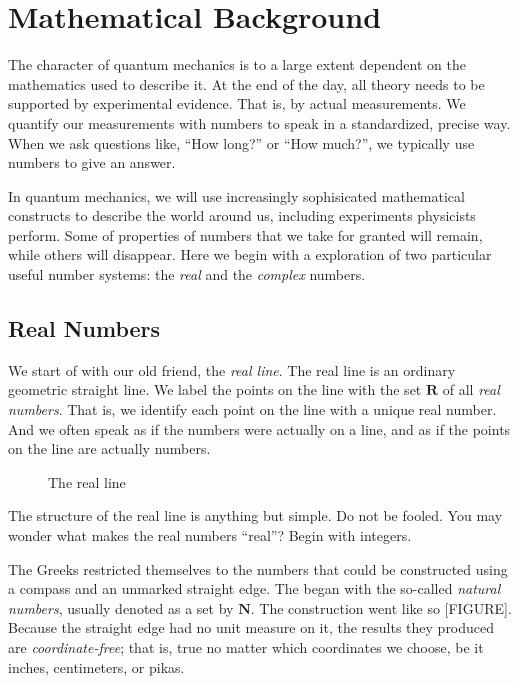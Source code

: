 \setchapterpreamble[u]{\margintoc}
\chapter{Mathematical Background}

The character of quantum mechanics is to a large extent dependent on the mathematics used to describe it. At the end of the day, all theory needs to be supported by experimental evidence. That is, by actual measurements. We quantify our measurements with numbers to speak in a standardized, precise way. When we ask questions like, ``How long?'' or ``How much?'', we typically use numbers to give an answer.

In quantum mechanics, we will use increasingly sophisicated mathematical constructs to describe the world around us, including experiments physicists perform. Some of properties of numbers that we take for granted will remain, while others will disappear. Here we begin with a exploration of two particular useful number systems: the \emph{real} and the \emph{complex} numbers.

\section{Real Numbers}

We start of with our old friend, the \emph{real line}. The real line is an ordinary geometric straight line. We label the points on the line with the set $\mathbf{R}$ of all \emph{real numbers}. That is, we identify each point on the line with a unique real number. And  we often speak as if the numbers were actually on a line, and as if the points on the line are actually numbers.

\begin{figure}[h]

\caption{The real line}
\end{figure}

The structure of the real line is anything but simple. Do not be fooled. You may wonder what makes the real numbers ``real''? Begin with integers.

The Greeks restricted themselves to the numbers that could be constructed using a compass and an unmarked straight edge. The began with the so-called \emph{natural numbers}, usually denoted as a set by $\mathbf{N}$. The construction went like so [FIGURE]. Because the straight edge had no unit measure on it, the results they produced are \emph{coordinate-free}; that is, true no matter which coordinates we choose, be it inches, centimeters, or pikas.

